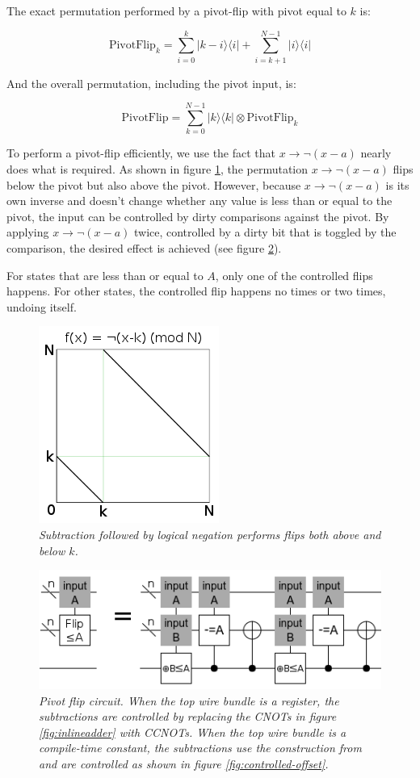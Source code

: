 \documentclass[twocolumn]{article}
\begin{document}
The exact permutation performed by a pivot-flip with pivot equal to $k$ is:

$$\text{PivotFlip}_k = \sum_{i=0}^k |k-i\rangle \langle i| + \sum_{i=k+1}^{N-1} |i\rangle \langle i|$$

And the overall permutation, including the pivot input, is:

$$\text{PivotFlip} = \sum_{k=0}^{N-1} |k\rangle \langle k| \otimes \text{PivotFlip}_{k}$$

To perform a pivot-flip efficiently, we use the fact that $x \rightarrow \lnot(x - a)$ nearly does what is required.
As shown in figure \ref{fig:double-flip}, the permutation $x \rightarrow \lnot(x - a)$ flips below the pivot but also above the pivot.
However, because $x \rightarrow \lnot(x - a)$ is its own inverse and doesn't change whether any value is less than or equal to the pivot, the input can be controlled by dirty comparisons against the pivot.
By applying $x \rightarrow \lnot(x - a)$ twice, controlled by a dirty bit that is toggled by the comparison, the desired effect is achieved (see figure \ref{fig:const-pivot-flip}).

For states that are less than or equal to $A$, only one of the controlled flips happens.
For other states, the controlled flip happens no times or two times, undoing itself.

\begin{figure}
  \centering
  \includegraphics[totalheight=4cm]{double-flip.png}
  \caption{\em Subtraction followed by logical negation performs flips both above and below $k$.}
  \label{fig:double-flip}
\end{figure}

\begin{figure}
  \centering
  \includegraphics[totalheight=2.7cm]{pivot-flip.png}
  \caption{\em Pivot flip circuit.
  When the top wire bundle is a register, the subtractions are controlled by replacing the CNOTs in figure \ref{fig:inlineadder} with CCNOTs.
  When the top wire bundle is a compile-time constant, the subtractions use the construction from \cite{haner2016} and are controlled as shown in figure \ref{fig:controlled-offset}.}
  \label{fig:const-pivot-flip}
\end{figure}
\end{document}
